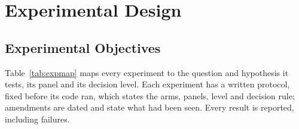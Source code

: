 \section{Experimental Design}\label{sec:design}
\subsection{Experimental Objectives}
Table~\ref{tab:expmap} maps every experiment to the question and hypothesis it tests, its panel and its decision level. Each experiment has
a written protocol, fixed before its code ran, which states the arms, panels, level and decision rule; amendments are dated and state what
had been seen. Every result is reported, including failures.
